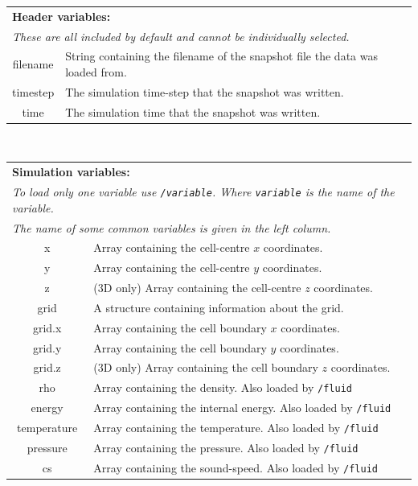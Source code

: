 \documentclass[11pt]{article}
\begin{document}
\begin{table}[!htbp]
\begin{center}
\begin{tabular}{|c|p{}|}
\multicolumn{2}{l}{{\bf Header variables:}}\\
\multicolumn{2}{l}{{\em These are all included by default and cannot be individually selected.}}\\
\hline
filename& String containing the filename of the snapshot file the data was loaded from.\\
timestep& The simulation time-step that the snapshot was written.\\
time& The simulation time that the snapshot was written.\\
\hline
\end{tabular}
\vspace{0.5cm}\\
\begin{tabular}{|c|p{}|}
\multicolumn{2}{l}{{\bf Simulation variables:}}\\
\multicolumn{2}{l}{{\em To load only one variable use \texttt{/variable}. Where \texttt{variable} is the name of the variable.}}\\
\multicolumn{2}{l}{{\em The name of some common variables is given in the left column.}}\\
\hline
x& Array containing the cell-centre $x$ coordinates.\\
y& Array containing the cell-centre $y$ coordinates.\\
z& (3D only) Array containing the cell-centre $z$ coordinates.\\
grid& A structure containing information about the grid.\\
grid.x& Array containing the cell boundary $x$ coordinates.\\
grid.y& Array containing the cell boundary $y$ coordinates.\\
grid.z& (3D only) Array containing the cell boundary $z$ coordinates.\\
rho& Array containing the density. Also loaded by \texttt{/fluid}\\
energy& Array containing the internal energy. Also loaded by \texttt{/fluid}\\
temperature& Array containing the temperature. Also loaded by \texttt{/fluid}\\
pressure& Array containing the pressure. Also loaded by \texttt{/fluid}\\
cs& Array containing the sound-speed. Also loaded by \texttt{/fluid}\\

\end{tabular}
\end{center}
\end{table}
\end{document}
